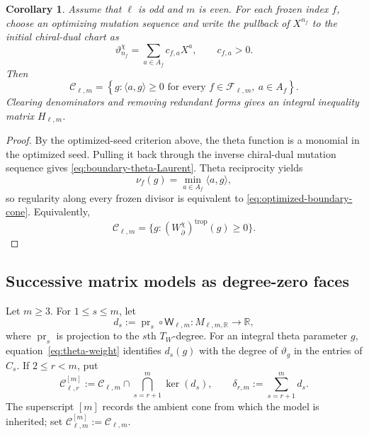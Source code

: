 \documentclass[11pt]{amsart}
\newtheorem{corollary}[theorem]{Corollary}
\theoremstyle{definition}
\theoremstyle{remark}
\begin{document}
\begin{corollary}\label{cor:boundary-cone-optimized-seeds}
Assume that $\ell$ is odd and $m$ is even.  For each frozen index $f$,
choose an optimizing mutation sequence and write the pullback of $X^{n_f}$ to
the initial chiral-dual chart as
\begin{equation}
 \vartheta_{n_f}^{\chi}=\sum_{a\in A_f}c_{f,a}X^a,
 \qquad c_{f,a}>0.
 \label{eq:boundary-theta-Laurent}
\end{equation}
Then
\begin{equation}
 \mathscr C_{\ell,m}
 =\left\{g:\langle a,g\rangle\ge0
   \text{ for every }f\in\mathscr F_{\ell,m},\ a\in A_f\right\}.
 \label{eq:optimized-boundary-cone}
\end{equation}
Clearing denominators and removing redundant forms gives an integral
inequality matrix $H_{\ell,m}$.
\end{corollary}

\begin{proof}
By the optimized-seed criterion above, the theta function is a monomial in
the optimized seed.  Pulling it back through the inverse chiral-dual
mutation sequence gives \eqref{eq:boundary-theta-Laurent}.  Theta reciprocity yields
\[ \nu_f(g)=\min_{a\in A_f}\langle a,g\rangle, \]
so regularity along every frozen divisor is equivalent to
\eqref{eq:optimized-boundary-cone}.  Equivalently,
\[ \mathscr C_{\ell,m} =\{g:(W_{\partial}^{\chi})^{\operatorname{trop}}(g)\ge0\}. \]
\end{proof}

\subsection{Successive matrix models as degree-zero faces}
\label{subsec:successive-matrix-faces}

Let $m\ge3$.  For $1\le s\le m$, let
\[ d_s:=\operatorname{pr}_s\circ\mathsf W_{\ell,m}:M_{\ell,m,\mathbb R}\longrightarrow\mathbb R, \]
where $\operatorname{pr}_s$ is projection to the $s$th $T_W$-degree.  For
an integral theta parameter $g$, equation~\eqref{eq:theta-weight}
identifies $d_s(g)$ with the degree of $\vartheta_g$ in the entries of
$C_s$.  If $2\le r<m$, put
\[ \mathscr C_{\ell,r}^{[m]}:=\mathscr C_{\ell,m}\cap\bigcap_{s=r+1}^m\ker(d_s), \qquad \delta_{r,m}:=\sum_{s=r+1}^m d_s. \]
The superscript $[m]$ records the ambient cone from which the model is
inherited; set $\mathscr C_{\ell,m}^{[m]}:=\mathscr C_{\ell,m}$.
\end{document}
